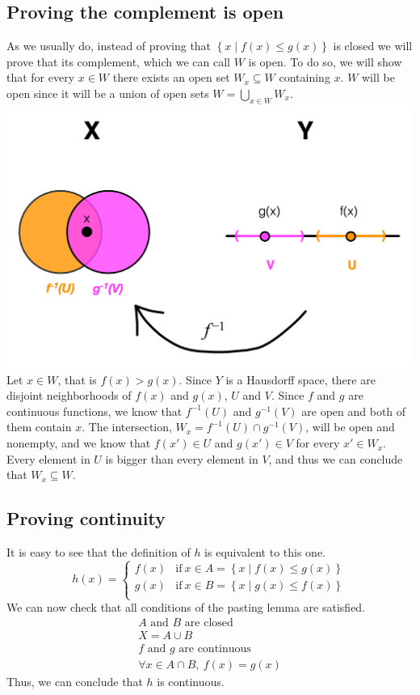 \documentclass{article}
\begin{document}
\subsection*{Proving the complement is open}
As we usually do, instead of proving that $\left\{x \mid f(x) \leq g(x)\right\}$ is closed we will prove that its complement, which we can call $W$ is open. To do so, we will show that for every $x \in W$ there exists an open set $W_x \subseteq W$ containing $x$. $W$ will be open since it will be a union of open sets $W = \bigcup\limits_{x \in W}W_x$. 
\\
\includegraphics[width=\textwidth]{diagram.png}
Let $x \in W$, that is $f(x) > g(x)$. Since $Y$ is a Hausdorff space, there are disjoint neighborhoods of $f(x)$ and $g(x)$, $U$ and $V$. Since $f$ and $g$ are continuous functions, we know that $f^{-1}(U)$ and $g^{-1}(V)$ are open and both of them contain $x$. The intersection, $W_x = f^{-1}(U) \cap g^{-1}(V)$, will be open and nonempty, and we know that $f(x') \in U$ and $g(x') \in V$ for every $x' \in W_x$. Every element in $U$ is bigger than every element in $V$, and thus we can conclude that $W_x \subseteq W$.
\subsection*{Proving continuity}
It is easy to see that the definition of $h$ is equivalent to this one.
\begin{equation*}
    h(x) = \left\{
        \begin{array}{ll}
        f(x) & \mathrm{if\ } x \in A = \left\{x \mid f(x) \leq g(x)\right\} \\
        g(x) & \mathrm{if\ } x \in B = \left\{x \mid g(x) \leq f(x)\right\} \\
        \end{array}
    \right.
\end{equation*}
We can now check that all conditions of the pasting lemma are satisfied.
\begin{gather*}
    \text{$A$ and $B$ are closed} \\
    X = A \cup B  \\
    \text{$f$ and $g$ are continuous} \\
    \forall x \in A \cap B,\ f(x) = g(x)
\end{gather*}
Thus, we can conclude that $h$ is continuous.
\end{document}
